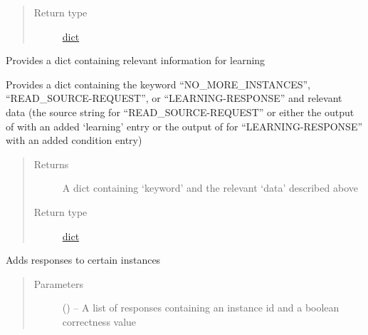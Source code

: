 \documentclass[letterpaper,10pt,english]{sphinxmanual}
\begin{document}
\begin{fulllineitems}
\begin{fulllineitems}
\begin{quote}
\begin{description}
\item[{Return type}] \leavevmode
\href{https://docs.python.org/2/library/stdtypes.html\#dict}{dict}

\end{description}\end{quote}

\end{fulllineitems}


\begin{fulllineitems}
\label{\detokenize{consumer:consumer.Consumer.provide_learning}}
Provides a dict containing relevant information for learning

Provides a dict containing the keyword ``NO\_MORE\_INSTANCES'', ``READ\_SOURCE-REQUEST'', or ``LEARNING-RESPONSE'' and relevant data (the source string for ``READ\_SOURCE-REQUEST'' or either the output of  with an added `learning' entry or the output of  for ``LEARNING-RESPONSE'' with an added condition entry)
\begin{quote}\begin{description}
\item[{Returns}] \leavevmode
A dict containing `keyword' and the relevant `data' described above

\item[{Return type}] \leavevmode
\href{https://docs.python.org/2/library/stdtypes.html\#dict}{dict}

\end{description}\end{quote}

\end{fulllineitems}


\begin{fulllineitems}
\label{\detokenize{consumer:consumer.Consumer.validate}}
Adds responses to certain instances
\begin{quote}\begin{description}
\item[{Parameters}] \leavevmode
{} (\href{https://docs.python.org/2/library/functions.html\#list}{}\sphinxstyleliteralemphasis{(}\href{https://docs.python.org/2/library/stdtypes.html\#dict}{}\sphinxstyleliteralemphasis{)}\sphinxstyleliteralemphasis{}) -- A list of responses containing an instance id and a boolean correctness value

\end{description}\end{quote}

\end{fulllineitems}


\end{fulllineitems}
\end{document}
